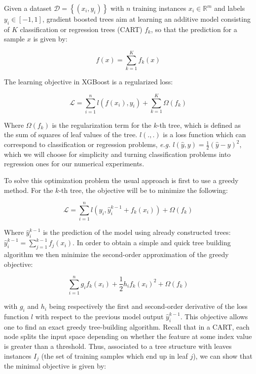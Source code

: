 \documentclass{article}
\theoremstyle{definition}
\begin{document}
Given a dataset $\mathcal{D} = \left\{ (x_i, y_i ) \right\}$ with $n$ training instances 
$x_i \in \mathbb{R}^m$ and labels $y_i \in [-1, 1]$, gradient boosted trees aim at learning an additive
model consisting of $K$ classification or regression trees (CART) $f_k$, so that the prediction for a sample $x$ is given by:

\begin{equation*} 
f(x) = \sum_{k = 1}^{K} f_k(x) 
\end{equation*}

The learning objective in XGBoost is a regularized loss:

\begin{equation} 
\mathcal{L} = \sum_{i=1}^n l( f(x_i), y_i) +  \sum_{k=1}^{K} \Omega(f_k) 
\end{equation} 

Where $\Omega(f_k)$ is the regularization term for the $k$-th tree, which is defined as the sum of squares of leaf values of the tree. $l(.,.)$ is a loss function which can correspond to classification or regression problems, \textsl{e.g.} $l(
\hat{y}, y) = \frac 12 (\hat{y} - y)^2$, which we will choose for simplicity and turning classification problems into regression ones for our numerical experiments. 

To solve this optimization problem the usual approach is first to use a greedy method. For the $k$-th tree, the objective will be to minimize the following:

\begin{equation*}
\mathcal{L} = \sum_{i=1}^n l(y_i, \hat{y}_i^{k-1} + f_k(x_i)) +   \Omega(f_k) 
\end{equation*}

Where $\hat{y}_i^{k-1}$ is the prediction of the model using already constructed trees: $\hat{y}_i^{k-1} = \sum_{j=1}^{k-1} f_j(x_i)$. In order to obtain a simple and quick tree building algorithm we then minimize the second-order approximation of the greedy objective:

\begin{equation} 
\sum_{i=1}^n  g_i f_k(x_i) + \frac 12 h_i f_k(x_i)^2 + \Omega(f_k) 
\end{equation} 

with $g_i$ and $h_i$ being respectively the first and second-order derivative of the loss function $l$ with respect to the previous model output $\hat{y}_i^{k-1}$. This objective allows one to find an exact greedy tree-building algorithm. Recall that in a CART, each node splits the input space depending on whether the feature at some index value is greater than a threshold. Thus, associated to a tree structure with leaves instances $I_j$ (the set of training samples which end up in leaf $j$), we can show that the minimal objective is given by: 
\end{document}
